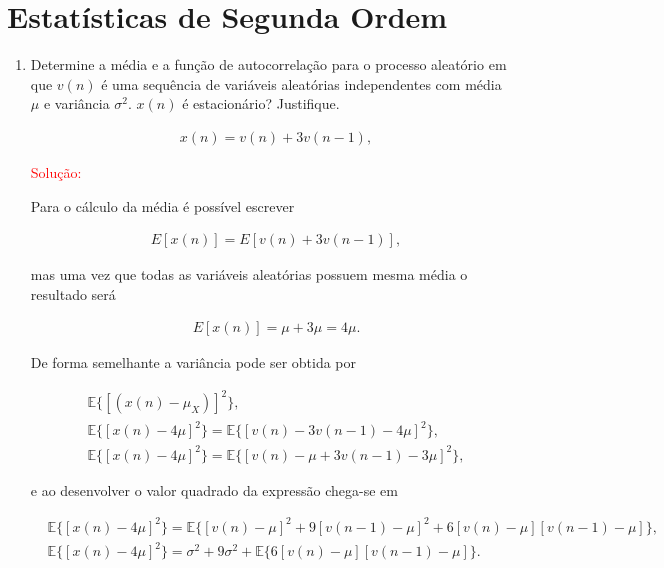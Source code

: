 \documentclass[a4paper,10pt]{article}
\begin{document}
	
	
	
	\section*{Estatísticas de Segunda Ordem}
	
		\begin{enumerate}
			
			\item Determine a média e a função de autocorrelação para o processo aleatório em que $v(n)$ é uma sequência de variáveis aleatórias independentes com média $\mu$ e variância $\sigma^2$. $x(n)$ é estacionário? Justifique.
			
				\begin{align}
					&x(n) = v(n) + 3 v(n-1),
				\end{align}
				
				\textcolor{red}{Solução:}
				
				Para o cálculo da média é possível escrever
				
				\begin{align}
					&E[x(n)] = E[v(n) + 3v(n-1)], 
				\end{align}
				
				mas uma vez que todas as variáveis aleatórias possuem mesma média o resultado será
				
				\begin{align}
					&E[x(n)] = \mu + 3\mu = 4\mu.  
				\end{align}
				
				De forma semelhante a variância pode ser obtida por 
				
				\begin{align}
					&\mathbb{E}\{[(x(n) - \mu_{X})]^2\}, \\
					&\mathbb{E}\{[x(n) - 4\mu]^2\} = \mathbb{E}\{[v(n) - 3v(n-1) -4\mu]^{2}\}, \\
					&\mathbb{E}\{[x(n) - 4\mu]^2\} = \mathbb{E}\{[v(n) - \mu + 3v(n-1) -3\mu]^{2}\},
				\end{align}
				
				e ao desenvolver o valor quadrado da expressão chega-se em
				
				\begin{align}
					&\mathbb{E}\{[x(n) - 4\mu]^2\} = \mathbb{E}\{ [v(n) - \mu]^{2} + 9[v(n-1) - \mu]^{2} + 6[v(n) - \mu][v(n-1) - \mu] \}, \\
					&\mathbb{E}\{[x(n) - 4\mu]^2\} = \sigma^{2} + 9\sigma^{2} + \mathbb{E}\{6[v(n) - \mu][v(n-1) - \mu]\}.
				\end{align}
				

\end{enumerate}
\end{document}
